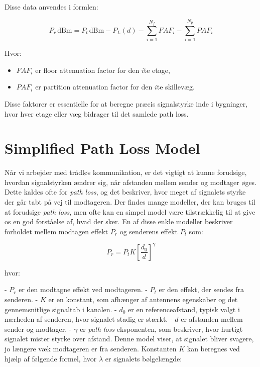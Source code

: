 \documentclass[a4paper,12pt]{book}
\begin{document}
	Disse data anvendes i formlen:
	
	\[
	P_r \, \text{dBm} = P_t \, \text{dBm} - P_L(d) - \sum_{i=1}^{N_f} FAF_i - \sum_{i=1}^{N_p} PAF_i
	\]
	
	Hvor:
	\begin{itemize}
		\item \( FAF_i \) er floor attenuation factor for den \( i \)te etage,
		\item \( PAF_i \) er partition attenuation factor for den \( i \)te skillevæg.
	\end{itemize}
	
	\noindent 
	Disse faktorer er essentielle for at beregne præcis signalstyrke inde i bygninger, hvor hver etage eller væg bidrager til det samlede path loss.
	
	
	\section{Simplified Path Loss Model}
	Når vi arbejder med trådløs kommunikation, er det vigtigt at kunne forudsige, hvordan signalstyrken ændrer sig, når afstanden mellem sender og modtager øges. Dette kaldes ofte for \textit{path loss}, og det beskriver, hvor meget af signalets styrke der går tabt på vej til modtageren.
	\newline\newline
	Der findes mange modeller, der kan bruges til at forudsige \textit{path loss}, men ofte kan en simpel model være tilstrækkelig til at give os en god forståelse af, hvad der sker. En af disse enkle modeller beskriver forholdet mellem modtagen effekt \( P_r \) og senderens effekt \( P_t \) som:
	
	\[
	P_r = P_t K \left[\frac{d_0}{d}\right]^\gamma
	\]
	
	\noindent hvor:
	
	- \( P_r \) er den modtagne effekt ved modtageren.
	- \( P_t \) er den effekt, der sendes fra senderen.
	- \( K \) er en konstant, som afhænger af antennens egenskaber og det gennemsnitlige signaltab i kanalen.
	- \( d_0 \) er en referenceafstand, typisk valgt i nærheden af senderen, hvor signalet stadig er stærkt.
	- \( d \) er afstanden mellem sender og modtager.
	- \( \gamma \) er \textit{path loss} eksponenten, som beskriver, hvor hurtigt signalet mister styrke over afstand.
	\newline\newline
	Denne model viser, at signalet bliver svagere, jo længere væk modtageren er fra senderen. Konstanten \( K \) kan beregnes ved hjælp af følgende formel, hvor \( \lambda \) er signalets bølgelængde:
	
\end{document}
